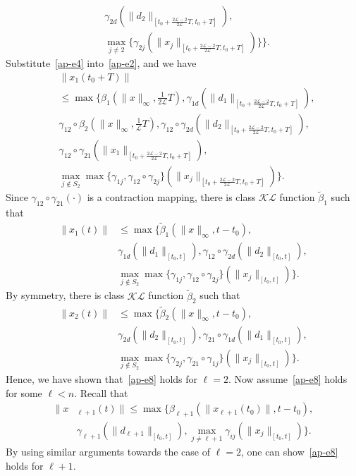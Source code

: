 \documentclass[journal]{IEEEtran}
\newcommand{\nnum}{\nonumber}
\newcommand{\LL}{{\mathcal{L}}}
\begin{document}
\begin{IEEEproof}
\begin{IEEEproof}
\begin{align}
&\gamma_{2d}(\|d_2\|_{[t_0+\frac{2\LL-2}{2\LL}T,t_0+T]}),\nnum\\
&\max_{j\neq2}\{\gamma_{2j}(\|x_j\|_{[t_0+\frac{2\LL-2}{2\LL}T,t_0+T]})\}\}.
\label{ap-e4}\end{align}
Substitute~\eqref{ap-e4} into~\eqref{ap-e2}, and we have \begin{align}&\|x_1(t_0+T)\|\nnum\\
&\leq \max\{\beta_1(\|x\|_{\infty},\frac{1}{2\LL}T),
\gamma_{1d}(\|d_1\|_{[t_0+\frac{2\LL-2}{2\LL}T,t_0+T]}),\nnum\\
&\gamma_{12}\circ\beta_2(\|x\|_{\infty},\frac{1}{\LL}T),\gamma_{12}\circ\gamma_{2d}(\|d_2\|_{[t_0+\frac{2\LL-2}{2\LL}T,t_0+T]}),\nnum\\
&\gamma_{12}\circ\gamma_{21}(\|x_1\|_{[t_0+\frac{2\LL-2}{2\LL}T,t_0+T]}),\nnum\\
&\max_{j\notin S_2}\max\{\gamma_{1j},\gamma_{12}\circ\gamma_{2j}\}
(\|x_j\|_{[t_0+\frac{2\LL-2}{2\LL}T,t_0+T]})\}.\label{ap-e5}\end{align}
Since $\gamma_{12}\circ\gamma_{21}(\cdot)$ is a contraction mapping, there is class $\mathcal{KL}$ function $\tilde{\beta}_1$ such that \begin{align}\|x_1(t)\|&\leq \max\{\tilde{\beta}_1(\|x\|_{\infty},t-t_0),\nnum\\
&\gamma_{1d}(\|d_1\|_{[t_0,t]}),\gamma_{12}\circ\gamma_{2d}(\|d_2\|_{[t_0,t]}),\nnum\\
&\max_{j\notin S_2}\max\{\gamma_{1j},\gamma_{12}\circ\gamma_{2j}\}(\|x_j\|_{[t_0,t]})\}.
\label{ap-e6}\end{align}
By symmetry, there is class $\mathcal{KL}$ function $\tilde{\beta}_2$ such that \begin{align}\|x_2(t)\|&\leq \max\{\tilde{\beta}_2(\|x\|_{\infty},t-t_0),\nnum\\
&\gamma_{2d}(\|d_2\|_{[t_0,t]}),
\gamma_{21}\circ\gamma_{1d}(\|d_1\|_{[t_0,t]}),\nnum\\
&\max_{j\notin S_2}\max\{\gamma_{2j},\gamma_{21}\circ\gamma_{1j}\}
(\|x_j\|_{[t_0,t]})\}.\label{ap-e7}\end{align} Hence, we have shown that~\eqref{ap-e8} holds for $\ell=2$.
Now assume~\eqref{ap-e8} holds for some $\ell<n$. Recall that 
\begin{align}\|x&_{\ell+1}(t)\|\leq \max\{\beta_{\ell+1}(\|x_{\ell+1}(t_0)\|,t-t_0),\nnum\\
&\gamma_{\ell+1}(\|d_{\ell+1}\|_{[t_0,t]}),
\max_{j\neq \ell+1}\gamma_{ij}(\|x_j\|_{[t_0,t]})\}.\label{ap-e9}\end{align} By using similar arguments towards the case of $\ell=2$, one can show~\eqref{ap-e8} holds for $\ell+1$.

\end{IEEEproof}
\end{IEEEproof}
\end{document}
